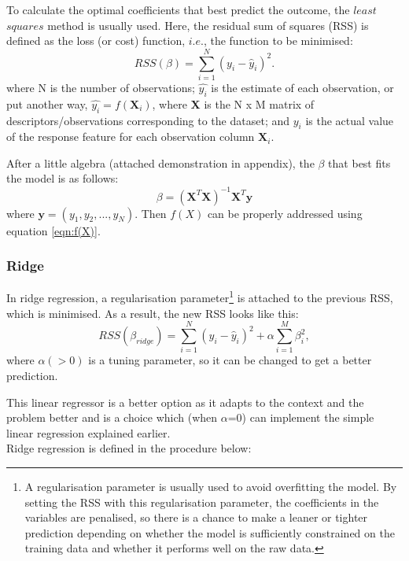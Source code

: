 To calculate the optimal coefficients that best predict the outcome, the $least$ $squares$ method is usually used. Here, the residual sum of squares (RSS) is defined as the loss (or cost) function, $i.e.$, the function to be minimised:
\begin{equation}
\label{eqn:RSS}
RSS(\beta)=\sum_{i=1}^N(y_i-\hat{y}_i)^2.
\end{equation}
where N is the number of observations; $\hat{y_i}$ is the estimate of each observation, or put another way, $\hat{y_i}=f(\textbf{X}_i)$, where \textbf{X} is the N x M matrix of descriptors/observations corresponding to the dataset; and $y_i$ is the actual value of the response feature for each observation column $\textbf{X}_i$.

After a little algebra (attached demonstration in appendix), the $\beta$ that best fits the model is as follows:
\begin{equation}
    \beta=(\textbf{X}^T\textbf{X})^{-1}\textbf{X}^T\textbf{y}
\end{equation}
where $\textbf{y}=(y_1,y_2,...,y_N)$. Then $f(X)$ can be properly addressed using equation \ref{eqn:f(X)}.
 
\subsubsection{Ridge}
In ridge regression, a regularisation parameter\footnote{A regularisation parameter is usually used to avoid overfitting the model. By setting the RSS with this regularisation parameter, the coefficients in the variables are penalised, so there is a chance to make a leaner or tighter prediction depending on whether the model is sufficiently constrained on the training data and whether it performs well on the raw data.} is attached to the previous RSS, which is minimised. As a result, the new RSS looks like this:
\begin{equation}
    RSS(\beta_{ridge})=\sum_{i=1}^N(y_i-\hat{y}_i)^2+\alpha \sum_{i=1}^M\beta_i^2,
\end{equation}
where $\alpha(>0)$ is a tuning parameter, so it can be changed to get a better prediction.

This linear regressor is a better option as it adapts to the context and the problem better and is a choice which (when $\alpha$=0) can implement  the simple linear regression explained earlier.\\

Ridge regression is defined in the procedure below:

